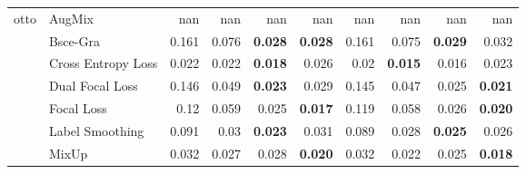 \begin{table}[htbp]
\begin{tabular}{l l rrrr rrrr}
\cline{1-10}
\multirow[t]{7}{*}{otto} & AugMix & nan & nan & nan & nan & nan & nan & nan & nan \\
 & Bsce-Gra & 0.161 & 0.076 & \textbf{0.028} & \textbf{0.028} & 0.161 & 0.075 & \textbf{0.029} & 0.032 \\
 & Cross Entropy Loss & 0.022 & 0.022 & \textbf{0.018} & 0.026 & 0.02 & \textbf{0.015} & 0.016 & 0.023 \\
 & Dual Focal Loss & 0.146 & 0.049 & \textbf{0.023} & 0.029 & 0.145 & 0.047 & 0.025 & \textbf{0.021} \\
 & Focal Loss & 0.12 & 0.059 & 0.025 & \textbf{0.017} & 0.119 & 0.058 & 0.026 & \textbf{0.020} \\
 & Label Smoothing & 0.091 & 0.03 & \textbf{0.023} & 0.031 & 0.089 & 0.028 & \textbf{0.025} & 0.026 \\
 & MixUp & 0.032 & 0.027 & 0.028 & \textbf{0.020} & 0.032 & 0.022 & 0.025 & \textbf{0.018} \\
\cline{1-10}
\bottomrule
\end{tabular}

        \end{table}
        
